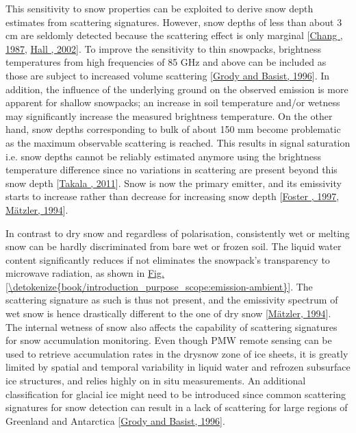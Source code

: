 \documentclass[letterpaper,10pt,english]{jupyterBook}
\begin{document}
\sphinxAtStartPar
This sensitivity to snow properties can be exploited to derive snow depth estimates from scattering signatures.
However, snow depths of less than about 3 cm are seldomly detected because the scattering effect is only marginal {[}\hyperlink{cite.book/references:id7}{Chang , 1987}, \hyperlink{cite.book/references:id2}{Hall , 2002}{]}.
To improve the sensitivity to thin snowpacks, brightness temperatures from high frequencies of 85 GHz and above can be included as those are subject to increased volume scattering {[}\hyperlink{cite.book/references:id9}{Grody and Basist, 1996}{]}.
In addition, the influence of the underlying ground on the observed emission is more apparent for shallow snowpacks; an increase in soil temperature and/or wetness may significantly increase the measured brightness temperature.
On the other hand, snow depths corresponding to bulk {\hyperref[\detokenize{book/acronyms:term-SWE}]{}} of about 150 mm become problematic as the maximum observable scattering is reached.
This results in signal saturation i.e. snow depths cannot be reliably estimated anymore using the brightness temperature difference since no variations in scattering are present beyond this snow depth {[}\hyperlink{cite.book/references:id19}{Takala , 2011}{]}.
Snow is now the primary emitter, and its emissivity starts to increase rather than decrease for increasing snow depth {[}\hyperlink{cite.book/references:id8}{Foster , 1997}, \hyperlink{cite.book/references:id13}{Mätzler, 1994}{]}.

\sphinxAtStartPar
In contrast to dry snow and regardless of polarisation, consistently wet or melting snow can be hardly discriminated from bare wet or frozen soil.
The liquid water content significantly reduces if not eliminates the snowpack’s transparency to microwave radiation, as shown in \hyperref[\detokenize{book/introduction_purpose_scope:emission-ambient}]{Fig.\@ \ref{\detokenize{book/introduction_purpose_scope:emission-ambient}}}.
The scattering signature as such is thus not present, and the emissivity spectrum of wet snow is hence drastically different to the one of dry snow {[}\hyperlink{cite.book/references:id13}{Mätzler, 1994}{]}.
The internal wetness of snow also affects the capability of scattering signatures for snow accumulation monitoring.
Even though PMW remote sensing can be used to retrieve accumulation rates in the dry\sphinxhyphen{}snow zone of ice sheets, it is greatly limited by spatial and temporal variability in liquid water and refrozen subsurface ice structures, and relies highly on in situ measurements.
An additional classification for glacial ice might need to be introduced since common scattering signatures for snow detection can result in a lack of scattering for large regions of Greenland and Antarctica {[}\hyperlink{cite.book/references:id9}{Grody and Basist, 1996}{]}.
\end{document}
